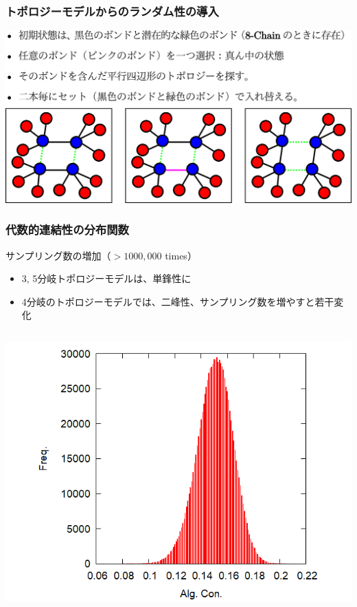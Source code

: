 \documentclass[aspectratio=169,11pt, dvipdfmx]{beamer}
\begin{document}
\begin{frame}
	\frametitle{トポロジーモデルからのランダム性の導入}
		\includegraphics[width=.9\textwidth]{bond_exchg.png}
\end{frame}

\begin{frame}
	\frametitle{代数的連結性の分布関数}
		\begin{exampleblock}{サンプリング数の増加（$> 1000,000$ times）}
			\begin{itemize}
				\item 3, 5分岐トポロジーモデルは、単鋒性に
				\item 4分岐のトポロジーモデルでは、二峰性、サンプリング数を増やすと若干変化
			\end{itemize}
		\end{exampleblock}
		\begin{columns}[totalwidth=1\textwidth]
				\begin{center}
					\includegraphics[width=.8\columnwidth]{3.png}


\end{center}
\end{columns}
\end{frame}
\end{document}
